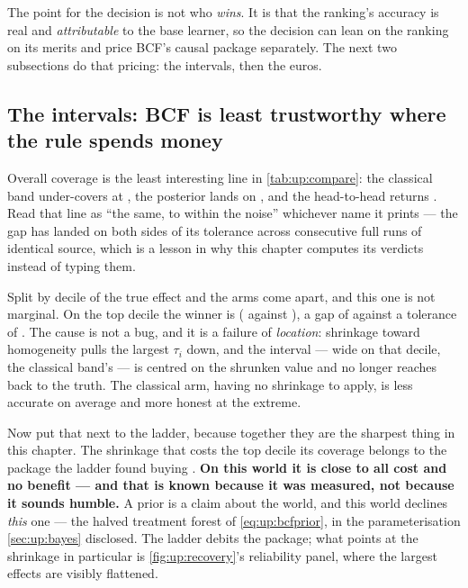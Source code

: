 The point for the decision is not who \emph{wins}. It is that the ranking's accuracy is real and
\emph{attributable} to the base learner, so the decision can lean on the ranking on its merits and
price BCF's causal package separately. The next two subsections do that pricing: the intervals, then
the euros.

\subsection*{The intervals: BCF is least trustworthy where the rule spends money}

Overall coverage is the least interesting line in \cref{tab:up:compare}: the classical band
under-covers at \pc{\nbOneBootCov}, the posterior lands on \pc{\nbOneBcfCovNinety}, and the
head-to-head returns \textbf{\nbOneHhCovWin}. Read that line as
``the same, to within the noise'' whichever name it prints --- the gap has landed on both sides of
its tolerance across consecutive full runs of identical source, which is a lesson in why this
chapter computes its verdicts instead of typing them.

Split by decile of the true effect and the arms come apart, and this one is not marginal. On the
top decile the winner is \textbf{\nbOneHhTopdecWin} (\pc{\nbOneBootTopDec} against
\pc{\nbOneBcfTopDec}), a gap of \nbOneHhTopdecGap{} against a tolerance of \nbOneHhTopdecTol. The
cause is not a bug, and it is a failure of \emph{location}: shrinkage toward homogeneity pulls the
largest $\tau_i$ down, and the interval --- \eur{\nbOneBcfTopdecWidth} wide on that decile,
\nbOneTopdecWidthVerdict{} the classical band's \eur{\nbOneBootTopdecWidth} --- is centred on the
shrunken value and no longer reaches back to the truth. The classical arm,
having no shrinkage to apply, is less accurate on average and more honest at the extreme.

Now put that next to the ladder, because together they are the sharpest thing in this chapter. The
shrinkage that costs the top decile its coverage belongs to the package the ladder found buying
\nbOneAttrBcfBuys. \textbf{On this world it is close to all cost and no benefit --- and that is
known because it was measured, not because it sounds humble.} A prior is a claim about the world,
and this world declines \emph{this} one --- the halved treatment forest of
\cref{eq:up:bcfprior}, in the parameterisation \cref{sec:up:bayes} disclosed. The ladder debits the
package; what points at the shrinkage in particular is \cref{fig:up:recovery}'s reliability panel,
where the largest effects are visibly flattened.

